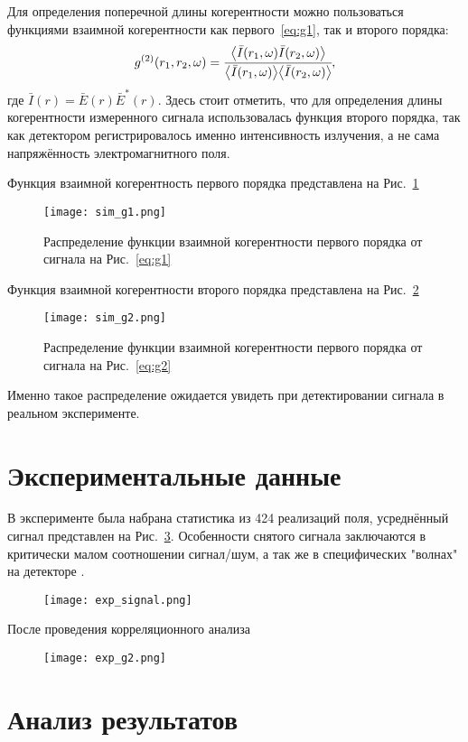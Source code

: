 Для определения поперечной длины когерентности можно пользоваться функциями взаимной когерентности как первого~\ref{eq:g1}, так и второго порядка:
\begin{align}
	g^{(2)} (r_1, r_2, \omega) = \cfrac{\big \langle \bar{I}(r_1, \omega) \bar{I}(r_2, \omega) \big \rangle}{\big \langle \bar{I}(r_1, \omega)\big \rangle \big \langle\bar{I}(r_2, \omega) \big \rangle}, 
	\label{eq:g2} 
\end{align}
где $\bar{I}(r) = \bar{E}(r)\bar{E}^*(r)$. Здесь стоит отметить, что для определения длины когерентности измеренного сигнала использовалась функция второго порядка, так как детектором регистрировалось именно интенсивность излучения, а не сама напряжённость электромагнитного поля.

Функция взаимной когерентность первого порядка представлена на Рис.~\ref{fig:sim_g1} 
\begin{figure}[H] 
	\centering 	\texttt{[image: sim\_g1.png]}
	\caption{Распределение функции взаимной когерентности первого порядка от сигнала на Рис.~\ref{eq:g1}}
	\label{fig:sim_g1}
\end{figure}
Функция взаимной когерентности второго порядка представлена на Рис.~\ref{fig:sim_g2}
\begin{figure}[H] 
	\centering 	\texttt{[image: sim\_g2.png]}
	\caption{Распределение функции взаимной когерентности первого порядка от сигнала на Рис.~\ref{eq:g2}}
	\label{fig:sim_g2}
\end{figure}
Именно такое распределение ожидается увидеть при детектировании сигнала в реальном эксперименте.
\section{Экспериментальные данные}
В эксперименте была набрана статистика из 424 реализаций поля, усреднённый сигнал представлен на Рис.~\ref{fig:exp_signal}. Особенности снятого сигнала заключаются в критически малом соотношении сигнал/шум, а так же в специфических "волнах" на детекторе .
\begin{figure}[H] 
	\centering 	\texttt{[image: exp\_signal.png]}
	\caption{}
	\label{fig:exp_signal}
\end{figure}
После проведения корреляционного анализа  
\begin{figure}[H] 
	\centering 	\texttt{[image: exp\_g2.png]}
	\caption{}
	\label{fig:exp_g2}
\end{figure}

\section{Анализ результатов}

\newpage

\clearpage